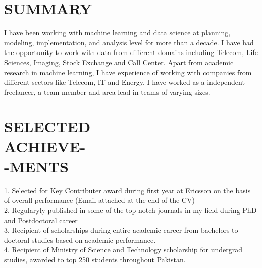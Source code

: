\documentclass[margin, 10pt]{res} %
\begin{document}
\begin{resume}

 
\section{SUMMARY}
I have been working with machine learning and data science at planning, modeling, implementation, and analysis level for more than a decade. 
I have had the opportunity to work with data from different domains including Telecom, Life Sciences, Imaging, Stock Exchange and Call Center.
Apart from academic research in machine learning, I have experience of working with companies from different sectors like Telecom, IT and Energy.
I have worked as a independent freelancer, a team member and area lead in teams of varying sizes.



\section{SELECTED \\ACHIEVE-\\-MENTS} 

 1. Selected for Key Contributer award during first year at Ericsson on the basis of overall performance (Email attached at the end of the CV) \\
 2. Regularyly published in some of the top-notch journals in my field during PhD and Postdoctoral career \\
 3. Recipient of scholarships during entire academic career from bachelors to doctoral studies based on academic performance. \\
 4. Recipient of Ministry of Science and Technology scholarship for undergrad studies, awarded to top 250 students throughout Pakistan.



\end{resume}
\end{document}
